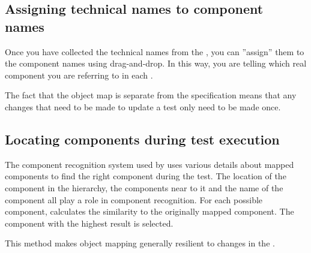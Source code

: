 
\subsection{Assigning technical names to component names}
Once you have collected the technical names from the \gdaut{}, you can ''assign'' them to the component names using drag-and-drop. In this way, you are telling \app{} which real component you are referring to in each \gdstep{}. 

The fact that the object map is separate from the specification means that any changes that need to be made to update a test only need to be made once. 

\subsection{Locating components during test execution}
 The component recognition system used by \app{} uses various details about mapped components to find the right component during the test. The location of the component in the \gdaut{} hierarchy, the components near to it and the name of the component all play a role in component recognition. For each possible component, \app{} calculates the similarity to the originally mapped component. The component with the highest result is selected. 

This method makes object mapping generally resilient to changes in the \gdaut{}. 
 


